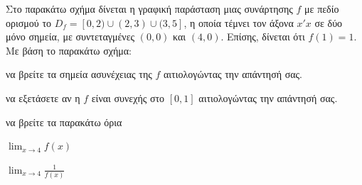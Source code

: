 Στο παρακάτω σχήμα δίνεται η γραφική παράσταση μιας συνάρτησης $f$ με πεδίο ορισμού το $D_f = [0,2) \cup (2,3) \cup (3,5]$, η οποία τέμνει τον άξονα $x'x$ σε δύο μόνο σημεία, με συντεταγμένες $(0,0)$ και $(4,0)$. Επίσης, δίνεται ότι $f(1)=1$.
Με βάση το παρακάτω σχήμα:
\begin{alist}
\item να βρείτε τα σημεία ασυνέχειας της $f$ αιτιολογώντας την απάντησή σας. 
\item να εξετάσετε αν η $f$ είναι συνεχής στο $[0,1]$ αιτιολογώντας την απάντησή σας. 
\item να βρείτε τα παρακάτω όρια
\begin{rlist}
\item $\lim_{x \to 4} f(x)$
\item $\lim_{x \to 4} \frac{1}{f(x)}$
\end{rlist}
\end{alist}